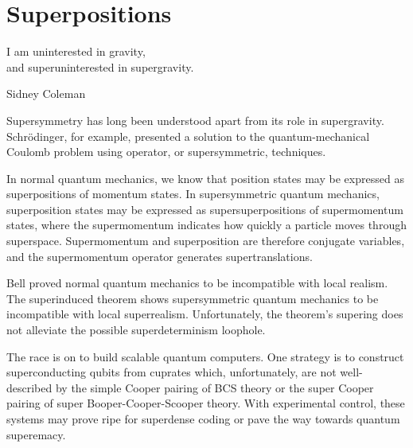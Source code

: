 \section{Superpositions}
\epigraph{I am uninterested in gravity,\\
and superuninterested in supergravity.}{Sidney Coleman\cite{vanNieuwenhuizen:2016}}

Supersymmetry has long been understood apart from its role in supergravity.
Schr\"{o}dinger, for example, presented a solution\cite{10.2307/20490744} to the quantum-mechanical Coulomb problem using operator, or supersymmetric, techniques\cite{RevModPhys.23.21}.

In normal quantum mechanics, we know that position states may be expressed as superpositions of momentum states.
In supersymmetric quantum mechanics, superposition states may be expressed as supersuperpositions of supermomentum states, where the supermomentum indicates how quickly a particle moves through superspace.
Supermomentum and superposition are therefore conjugate variables, and the supermomentum operator generates supertranslations.

Bell proved normal quantum mechanics to be incompatible with local realism\cite{bell1964einstein}.
The superinduced theorem shows supersymmetric quantum mechanics to be incompatible with local superrealism.
Unfortunately, the theorem's supering does not alleviate the possible superdeterminism loophole.

The race is on to build scalable quantum computers.
One strategy is to construct superconducting qubits from cuprates which, unfortunately, are not well-described by the simple Cooper pairing of BCS theory\cite{Bardeen:1957kj} or the super Cooper pairing of super Booper-Cooper-Scooper theory.
With experimental control, these systems may prove ripe for superdense coding\cite{PhysRevLett.69.2881} or pave the way towards quantum superemacy\cite{Preskill:2012tg}.
